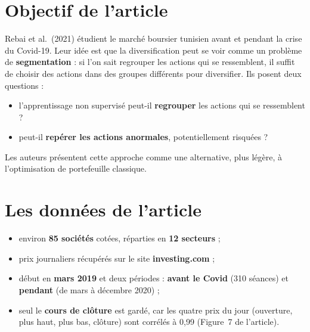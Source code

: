 \documentclass[11pt,a4paper]{article}
\begin{document}
\section{Objectif de l'article}\label{sec:art-objectif}
Rebai et al.\ (2021) étudient le marché boursier tunisien avant et pendant la crise du Covid-19. Leur idée est que la diversification peut se voir comme un problème de \textbf{segmentation} : si l'on sait regrouper les actions qui se ressemblent, il suffit de choisir des actions dans des groupes différents pour diversifier. Ils posent deux questions :
\begin{itemize}
  \item l'apprentissage non supervisé peut-il \textbf{regrouper} les actions qui se ressemblent ?
  \item peut-il \textbf{repérer les actions anormales}, potentiellement risquées ?
\end{itemize}
Les auteurs présentent cette approche comme une alternative, plus légère, à l'optimisation de portefeuille classique.

\section{Les données de l'article}\label{sec:art-donnees}
\begin{itemize}
  \item environ \textbf{85 sociétés} cotées, réparties en \textbf{12 secteurs} ;
  \item prix journaliers récupérés sur le site \textbf{investing.com} ;
  \item début en \textbf{mars 2019} et deux périodes : \textbf{avant le Covid} (310 séances) et \textbf{pendant} (de mars à décembre 2020) ;
  \item seul le \textbf{cours de clôture} est gardé, car les quatre prix du jour (ouverture, plus haut, plus bas, clôture) sont corrélés à 0,99 (Figure~7 de l'article).
\end{itemize}
\end{document}

